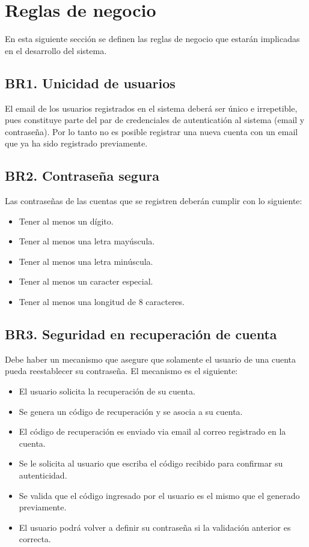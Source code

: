 
\section{Reglas de negocio}
En esta siguiente sección se definen las reglas de negocio que estarán implicadas en el desarrollo del sistema.\par
\subsection{BR1. Unicidad de usuarios}
El email de los usuarios registrados en el sistema deberá ser único e irrepetible, pues constituye parte del par de credenciales de autenticatión al sistema (email y contraseña). Por lo tanto no es posible registrar una nueva cuenta con un email que ya ha sido registrado previamente.

\subsection{BR2. Contraseña segura}
Las contraseñas de las cuentas que se registren deberán cumplir con lo siguiente:
\begin{itemize}
	\item Tener al menos un dígito.
	\item Tener al menos una letra mayúscula.
	\item Tener al menos una letra minúscula.
	\item Tener al menos un caracter especial.
	\item Tener al menos una longitud de 8 caracteres.
\end{itemize}

\subsection{BR3. Seguridad en recuperación de cuenta}
Debe haber un mecanismo que asegure que solamente el usuario de una cuenta pueda reestablecer su contraseña. El mecanismo es el siguiente:
\begin{itemize}
	\item El usuario solicita la recuperación de su cuenta.
	\item Se genera un código de recuperación y se asocia a su cuenta.
	\item El código de recuperación es enviado via email al correo registrado en la cuenta.
	\item Se le solicita al usuario que escriba el código recibido para confirmar su autenticidad.
	\item Se valida que el código ingresado por el usuario es el mismo que el generado previamente.
	\item El usuario podrá volver a definir su contraseña si la validación anterior es correcta.
\end{itemize}


